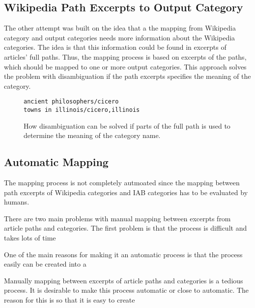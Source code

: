 \subsection{Wikipedia Path Excerpts to Output Category}
The other attempt was built on the idea that a the mapping from Wikipedia category and output categories needs more information about the Wikipedia categories. The idea is that this information could be found in excerpts of articles' full paths. Thus, the mapping process is based on excerpts of the paths, which should be mapped to one or more output categories. This approach solves the problem with disambiguation if the path excerpts specifies the meaning of the category. 

\begin{figure}
\centering
\begin{lstlisting}
ancient philosophers/cicero
towns in illinois/cicero,illinois
\end{lstlisting}
\caption[Avoiding disambiguation with excerpts of category paths]{How disambiguation can be solved if parts of the full path is used to determine the meaning of the category name.}
\label{fig:solving_disambiguation}
\end{figure}

\subsection{Automatic Mapping}
The mapping process is not completely autmoated since the mapping between path excerpts of Wikipedia categories and IAB categories has to be evaluated by humans. 

\begin{comment}
INSERT EXAMPLE ABOUT WALKING HERE. 
\end{comment}

There are two main problems with manual mapping between excerpts from article paths and categories. The first problem is that the process is difficult and takes lots of time

One of the main reasons for making it an automatic process is that the process easily can be created into a 


Manually mapping between excerpts of article paths and categories is a tedious process. It is desirable to make this  process automatic or close to automatic. The reason for this is so that it is easy to create 


